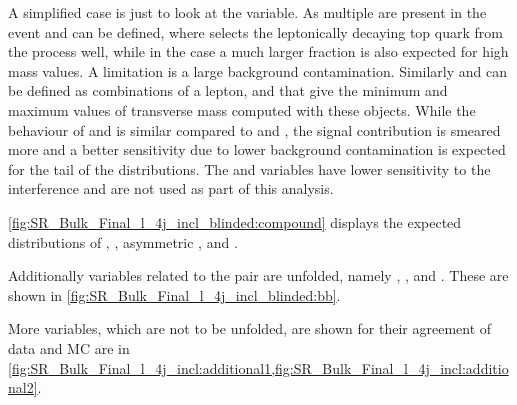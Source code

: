 A simplified case is just to look at the \mbl variable. As multiple \bjets
are present in the event \mblmin and \mblmax can be defined, where \mblmin
selects the leptonically decaying top quark from the \ttbar process well, while in the \tW case a much
larger fraction is also expected for high mass values. A limitation is a large background contamination.
Similarly \mtblmin and \mtblmax can be defined as combinations of a lepton, \bjet
and \met that give the minimum and maximum values of transverse mass computed
with these objects. While the behaviour of \mtblmin and \mtblmax is similar compared to 
\mblmin and \mblmax, the signal contribution is
smeared more and a better sensitivity due to lower background contamination
is expected for the tail of the distributions.
The \mblmax and \mtblmax variables have lower sensitivity to the interference
and are not used as part of this analysis.


\cref{fig:SR_Bulk_Final_l_4j_incl_blinded:compound} displays the expected distributions
of \met,  \mtW, asymmetric \amttwo, \mtblmin and \mblmin.

Additionally variables related to the \bjet pair are unfolded, namely
\mbb, \ptbb, \deltaRbb and \deltaRbbl. These are shown
in \cref{fig:SR_Bulk_Final_l_4j_incl_blinded:bb}.

More variables, which are not to be unfolded, are shown for their agreement of data and MC are
in \cref{fig:SR_Bulk_Final_l_4j_incl:additional1,fig:SR_Bulk_Final_l_4j_incl:additional2}.

